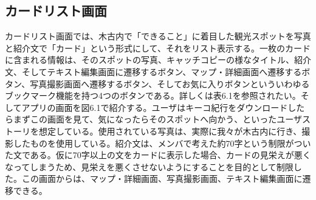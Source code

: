 \subsection{カードリスト画面}
カードリスト画面では、木古内で「できること」に着目した観光スポットを写真と紹介文で「カード」という形式にして、それをリスト表示する。一枚のカードに含まれる情報は、そのスポットの写真、キャッチコピーの様なタイトル、紹介文、そしてテキスト編集画面に遷移するボタン、マップ・詳細画面へ遷移するボタン、写真撮影画面へ遷移するボタン、そしてお気に入りボタンといういわゆるブックマーク機能を持つ4つのボタンである。詳しくは表6.1を参照されたい。そしてアプリの画面を図6.1で紹介する。ユーザはキーコ紀行をダウンロードしたらまずこの画面を見て、気になったらそのスポットへ向かう、といったユーザストーリを想定している。使用されている写真は、実際に我々が木古内に行き、撮影したものを使用している。紹介文は、メンバで考えた約70字という制限がついた文である。仮に70字以上の文をカードに表示した場合、カードの見栄えが悪くなってしまうため、見栄えを悪くさせないようにすることを目的として制限した。この画面からは、マップ・詳細画面、写真撮影画面、テキスト編集画面に遷移できる。

\newpage

